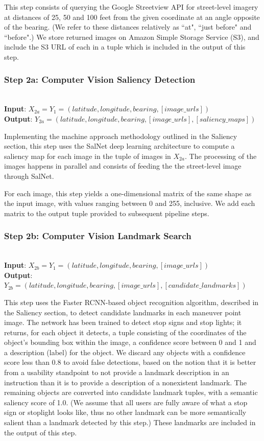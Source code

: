 This step consists of querying the Google Streetview API for street-level imagery at distances of 25, 50 and 100 feet from the given coordinate at an angle opposite of the bearing. (We refer to these distances relatively as ``at", ``just before" and ``before".) We store returned images on Amazon Simple Storage Service (S3), and include the S3 URL of each in a tuple which is included in the output of this step. 

\subsubsection*{Step 2a: Computer Vision Saliency Detection}~\\
\noindent\textbf{Input}: $X_{2a} = Y_1 = (latitude, longitude, bearing, [image\_urls])$\\
\textbf{Output}: $Y_{2a} = (latitude, longitude, bearing, [image\_urls], [saliency\_maps])$ 

Implementing the machine approach methodology outlined in the Saliency section, this step uses the SalNet deep learning architecture to compute a saliency map for each image in the tuple of images in $X_{2a}$. The processing of the images happens in parallel and consists of feeding the the street-level image through SalNet.

For each image, this step yields a one-dimensional matrix of the same shape as the input image, with values ranging between 0 and 255, inclusive. We add each matrix to the output tuple provided to subsequent pipeline steps.

\subsubsection*{Step 2b: Computer Vision Landmark Search}~\\
\noindent\textbf{Input}: $X_{2b} = Y_1 = (latitude, longitude, bearing, [image\_urls])$\\
\textbf{Output}: $Y_{2b} = (latitude, longitude, bearing,  [image\_urls], [candidate\_landmarks] )$ 

This step uses the Faster RCNN-based object recognition algorithm, described in the Saliency section, to detect candidate landmarks in each maneuver point image. The network has been trained to detect stop signs and stop lights; it returns, for each object it detects, a tuple consisting of the coordinates of the object’s bounding box within the image, a confidence score between 0 and 1 and a description (label) for the object. We discard any objects with a confidence score less than 0.8 to avoid false detections, based on the notion that it is better from a usability standpoint to not provide a landmark description in an instruction than it is to provide a description of a nonexistent landmark. The remaining objects are converted into candidate landmark tuples, with a semantic saliency score of 1.0. (We assume that all users are fully aware of what a stop sign or stoplight looks like, thus no other landmark can be more semantically salient than a landmark detected by this step.) These landmarks are included in the output of this step.

